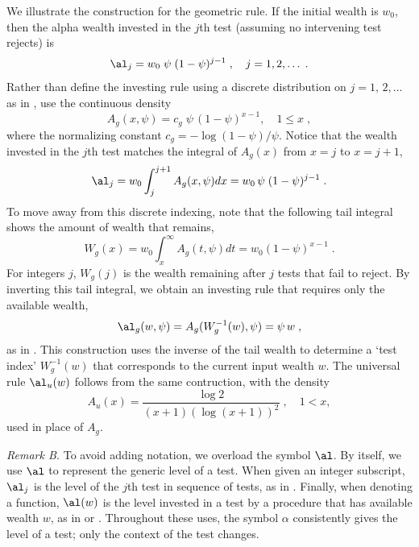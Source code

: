 \documentclass[12pt]{article}
\begin{document}
We illustrate the construction for the geometric rule.  If the initial wealth
 is $w_0$, then the alpha wealth invested in the $j$th test (assuming no
 intervening test rejects) is
 \begin{equation}
    \al_j = w_0\; \psi \; (1-\psi)^{j-1} \;, \quad j = 1, 2, \ldots\;.   
 \label{eq:alj1}
 \end{equation}
  Rather than define the investing rule using a discrete distribution on
 $j=1,\,2,\ldots$ as in , use the continuous density
 \begin{equation}
   A_g(x,\psi) = c_g \; \psi\,(1-\psi)^{x-1}, \quad 1 \le x\;,
 \label{eq:alg}
 \end{equation}
 where the normalizing constant $c_g = -\log (1-\psi)/\psi$.  Notice that the
 wealth invested in the $j$th test  matches the integral of
 $A_g(x)$ from $x=j$ to $x=j+1$,
 \begin{equation}
    \al_j = w_0 \int_j^{j+1} A_g(x,\psi) dx = w_0 \, \psi\; (1-\psi)^{j-1} \;.
 \label{eq:alj2}
 \end{equation}
 To move away from this discrete indexing, note that the following tail integral
 shows the amount of wealth that remains,
 \begin{equation}
    W_g(x) = w_0 \int_x^\infty A_g(t,\psi) dt = w_0 (1-\psi)^{x-1}\;.
 \label{eq:Wg}
 \end{equation}
 For integers $j$, $W_g(j)$ is the wealth remaining after $j$ tests that fail to
 reject.  By inverting this tail integral, we obtain an investing rule that
 requires only the available wealth,
 \begin{equation}
   \al_g(w,\psi) = A_g(W_g^{-1}(w),\psi) = \psi\,w \;,
 \label{eq:Ag}
 \end{equation}
 as in .  This construction uses the inverse of the tail wealth to
 determine a `test index' $W_g^{-1}(w)$ that corresponds to the current input
 wealth $w$.  The universal rule $\al_u(w)$ follows from the same
 contruction, with the density
 \begin{displaymath}
    A_u(x) = \frac{\log 2}{(x+1) (\log(x+1))^2} \;, \quad 1 < x,
 \end{displaymath}
 used in place of $A_g$.

 \vspace*{0.2in}
 \noindent
 {\it Remark B. } To avoid adding notation, we overload the symbol $\al$.  By
 itself, we use $\al$ to represent the generic level of a test.  When given an
 integer subscript, $\al_j$ is the level of the $j$th test in sequence of tests,
 as in .  Finally, when denoting a function, $\al(w)$ is the level
 invested in a test by a procedure that has available wealth $w$, as in
  or .  Throughout these uses, the symbol $\alpha$
 consistently gives the level of a test; only the context of the test changes.
\end{document}
